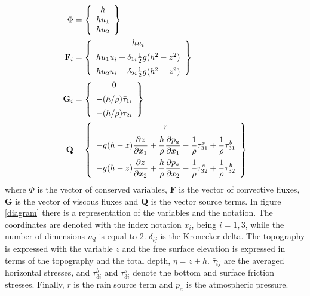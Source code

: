\documentclass[a4paper,12pt]{article}
\newcommand{\pder}[2]{\frac{\partial#1}{\partial#2}}
\begin{document}
\begin{subequations}\label{variables_and_fluxes}
\allowdisplaybreaks
\begin{align}
\Phi &= \left\{
    \begin{array}{c}
        h \\
        hu_1 \\
        hu_2
    \end{array}\right\} \\
\mathbf{F}_i &= \left\{
    \begin{array}{c}
        hu_i \\ [5pt]
        hu_1u_i + \delta_{1i}\frac{1}{2}g(h^2 - z^2) \\ [5pt]
        hu_2u_i + \delta_{2i}\frac{1}{2}g(h^2 - z^2)
    \end{array}\right\} \\
\mathbf{G}_i &= \left\{
    \begin{array}{c}
        0 \\ [5pt]
        -(h/\rho) \bar{\tau}_{1i} \\ [5pt]
        -(h/\rho) \bar{\tau}_{2i}
    \end{array}\right\} \\
\mathbf{Q} &= \left\{
    \begin{array}{c}
        r \\ [5pt]
        \displaystyle -g(h-z)\pder{z}{x_1} + \frac{h}{\rho}\pder{p_a}{x_1}
        - \frac{1}{\rho}\tau^s_{31} + \frac{1}{\rho}\tau^b_{31} \\ [10pt]
        \displaystyle -g(h-z)\pder{z}{x_2} + \frac{h}{\rho}\pder{p_a}{x_2}
        - \frac{1}{\rho}\tau^s_{32} + \frac{1}{\rho}\tau^b_{32}
    \end{array}\right\}
\end{align}
\end{subequations}
where $\Phi$ is the vector of conserved variables, $\mathbf{F}$ is the vector of convective fluxes, $\mathbf{G}$ is the vector of viscous fluxes and $\mathbf{Q}$ is the vector source terms. In figure \ref{diagram} there is a representation of the variables and the notation. The coordinates are denoted with the index notation $x_i$, being $i=1,3$, while the number of dimensions $n_d$ is equal to 2. $\delta_{ij}$ is the Kronecker delta. The topography is expressed with the variable $z$ and the free surface elevation is expressed in terms of the topography and the total depth, $\eta = z + h$. $\bar{\tau}_{ij}$ are the averaged horizontal stresses, and $\tau^b_{3i}$ and $\tau^s_{3i}$ denote the bottom and surface friction stresses. Finally, $r$ is the rain source term and $p_a$ is the atmospheric pressure.
\end{document}

